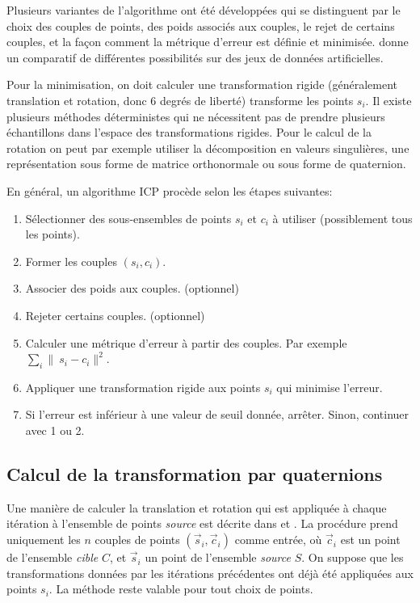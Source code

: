\documentclass[a4paper,10pt]{scrreprt}
\begin{document}
Plusieurs variantes de l'algorithme ont été développées qui se distinguent par le choix des couples de points, des poids associés aux couples, le rejet de certains couples, et la façon comment la métrique d'erreur est définie et minimisée. \cite{Rusi2001} donne un comparatif de différentes possibilités sur des jeux de données artificielles.

Pour la minimisation, on doit calculer une transformation rigide (généralement translation et rotation, donc $6$ degrés de liberté) transforme les points $s_i$. Il existe plusieurs méthodes déterministes qui ne nécessitent pas de prendre plusieurs échantillons dans l'espace des transformations rigides. Pour le calcul de la rotation on peut par exemple utiliser la décomposition en valeurs singulières, une représentation sous forme de matrice orthonormale ou sous forme de quaternion. \cite{Horn1986}

En général, un algorithme ICP procède selon les étapes suivantes:
\begin{enumerate}
	\item Sélectionner des sous-ensembles de points ${s_i}$ et ${c_i}$ à utiliser (possiblement tous les points).
	\item Former les couples $(s_i, c_i)$.
	\item Associer des poids aux couples. (optionnel)
	\item Rejeter certains couples. (optionnel)
	\item Calculer une métrique d'erreur à partir des couples. Par exemple $\sum_{i} \|\ s_i - c_i \|^2$.
	\item Appliquer une transformation rigide aux points ${s_i}$ qui minimise l'erreur.
	\item Si l'erreur est inférieur à une valeur de seuil donnée, arrêter. Sinon, continuer avec 1 ou 2. 
\end{enumerate}


\subsection{Calcul de la transformation par quaternions} \label{sec:quat_trans}
Une manière de calculer la translation et rotation qui est appliquée à chaque itération à l'ensemble de points \emph{source} est décrite dans \cite{Besl1992} et \cite{Horn1986}. La procédure prend uniquement les $n$ couples de points $(\vec{s}_i, \vec{c}_i)$ comme entrée, où $\vec{c}_i$ est un point de l'ensemble \emph{cible} $C$, et $\vec{s}_i$ un point de l'ensemble \emph{source} $S$. On suppose que les transformations données par les itérations précédentes ont déjà été appliquées aux points $s_i$. La méthode reste valable pour tout choix de points.
\end{document}
